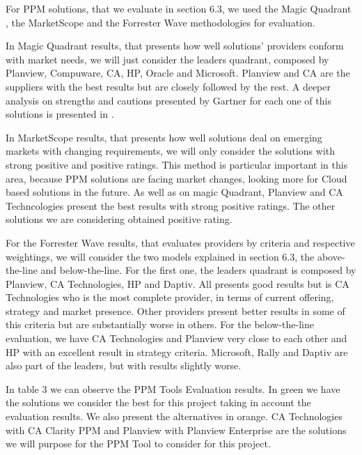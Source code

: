 For PPM solutions, that we evaluate in section 6.3, we used the Magic Quadrant , the MarketScope and the Forrester Wave methodologies for evaluation.\par
In Magic Quadrant results, that presents how well solutions' providers conform with market needs, we will just consider the leaders quadrant, composed by Planview, Compuware, CA, HP, Oracle and Microsoft. Planview and CA are the suppliers with the best results but are closely followed by the rest. A deeper analysis on strengths and cautions presented by Gartner for each one of this solutions is presented in \cite{magicQuadrantPPM}.\par
In MarketScope results, that presents how well solutions deal on emerging markets with changing requirements, we will only consider the solutions with strong positive and positive ratings. This method is particular important in this area, because PPM solutions are facing market changes, looking more for Cloud based solutions in the future. As well as on magic Quadrant, Planview and CA Techncologies present the best results with strong positive ratings. The other solutions we are considering obtained positive rating.\par
For the Forrester Wave results, that evaluates providers by criteria and respective weightings, we will consider the two models explained in section 6.3, the above-the-line and below-the-line. For the first one, the leaders quadrant is composed by Planview, CA Technologies, HP and Daptiv. All presents good results but is CA Technologies who is the most complete provider, in terms of current offering, strategy and market presence. Other providers present better results in some of this criteria but are substantially worse in others. For the below-the-line evaluation, we have CA Technologies and Planview very close to each other and HP with an excellent result in strategy criteria. Microsoft, Rally and Daptiv are also part of the leaders, but with results slightly worse.\par
In table 3 we can observe the PPM Tools Evaluation results. In green we have the solutions we consider the best for this project taking in account the evaluation results. We also present the alternatives in orange. CA Technologies with CA Clarity PPM and Planview with Planview Enterprise are the solutions we will purpose for the PPM Tool to consider for this project.


